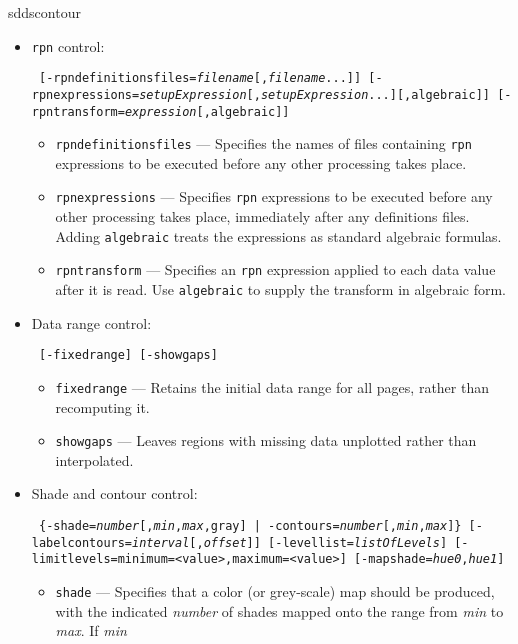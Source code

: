 \begin{sddsprog}{sddscontour}
\begin{itemize}
    \item \verb|rpn| control:
\begin{flushleft}{\tt
[-rpndefinitionsfiles={\em filename}[,{\em filename}...]]
[-rpnexpressions={\em setupExpression}[,{\em setupExpression}...][,algebraic]]
[-rpntransform={\em expression}[,algebraic]]
}\end{flushleft}
        \begin{itemize}
        \item \verb|rpndefinitionsfiles| --- Specifies the names of files containing \verb|rpn| expressions
        to be executed before any other processing takes place.
        \item \verb|rpnexpressions| --- Specifies \verb|rpn| expressions to be executed before any other processing
         takes place, immediately after any definitions files.  Adding \verb|algebraic| treats the
         expressions as standard algebraic formulas.
        \item \verb|rpntransform| --- Specifies an \verb|rpn| expression applied to each data value after it is read.
         Use \verb|algebraic| to supply the transform in algebraic form.
        \end{itemize}
    \item Data range control:
\begin{flushleft}{\tt
[-fixedrange] [-showgaps]
}\end{flushleft}
        \begin{itemize}
        \item \verb|fixedrange| --- Retains the initial data range for all pages, rather than recomputing it.
        \item \verb|showgaps| --- Leaves regions with missing data unplotted rather than interpolated.
        \end{itemize}
    \item Shade and contour control:
\begin{flushleft}{\tt
\{-shade={\em number}[,{\em min},{\em max},gray] | -contours={\em number}[,{\em min},{\em max}]\}
[-labelcontours={\em interval}[,{\em offset}]]
[-levellist={\em listOfLevels}] [-limitlevels={minimum=<value>,}{maximum=<value>}]
[-mapshade={\em hue0},{\em hue1}]
}\end{flushleft}
        \begin{itemize}
        \item \verb|shade| --- Specifies that a color (or grey-scale) map should be produced, with the
        indicated {\em number} of shades mapped onto the range from {\em min} to {\em max}.  If {\em min}

\end{itemize}
\end{itemize}
\end{sddsprog}

